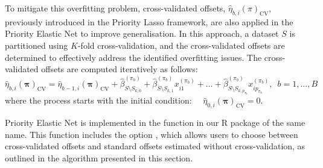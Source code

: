 To mitigate this overfitting problem, cross-validated offsets, $\hat{\eta}_{b,i}(\pi)_\text{CV}$, previously introduced in the Priority Lasso framework, are also applied in the Priority Elastic Net to improve generalisation. In this approach, a dataset \(S\) is partitioned using \(K\)-fold cross-validation, and the cross-validated offsets are determined to effectively address the identified overfitting issues. The cross-validated offsets are computed iteratively as follows:
    \begin{equation}
        \hat{\eta}_{b,i}(\bm{\pi})_\text{CV} = \hat{\eta}_{b-1,i}(\bm{\pi})_\text{CV} +
        \hat{\beta}^{(\pi_b)}_{S \setminus S_{k,0}}
        + \hat{\beta}^{(\pi_b)}_{S \setminus S_{k,1}}x_{i1}^{(\pi_b)}
        + \ldots 
        + \hat{\beta}^{(\pi_b)}_{S \setminus S_{k,p_{\pi_b}}}x_{ip_{\pi_b}}^{(\pi_b)},  \, \, \,  b = 1, . . . , B   
    \end{equation}
where the process starts with the initial condition: \,\,\,\, $\hat{\eta}_{0,i}(\bm{\pi})_\text{CV} = 0$.

Priority Elastic Net is implemented in the  function in our R package of the same name. This function includes the option , which allows users to choose between cross-validated offsets and standard offsets estimated without cross-validation, as outlined in the algorithm presented in this section.

